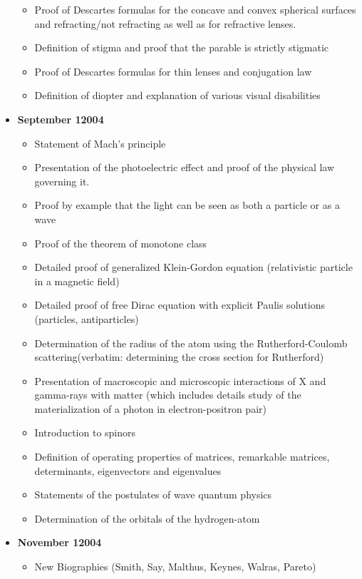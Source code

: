 \begin{itemize}
\begin{itemize}[noitemsep]
			\item Proof of Descartes formulas for the concave and convex spherical surfaces and refracting/not refracting as well as for refractive lenses.
			\item Definition of stigma and proof that the parable is strictly stigmatic
			\item Proof of Descartes formulas for thin lenses and conjugation law
			\item Definition of diopter and explanation of various visual disabilities
		\end{itemize}
	\item \textbf{September 12004}
		\begin{itemize}[noitemsep]
			\item Statement of Mach's principle
			\item Presentation of the photoelectric effect and proof of the physical law governing it.
			\item Proof by example that the light can be seen as both a particle or as a wave
			\item Proof of the theorem of monotone class
			\item Detailed proof of generalized Klein-Gordon equation (relativistic particle in a magnetic field) 
			\item Detailed proof of free Dirac equation with explicit Paulis solutions (particles, antiparticles)
			\item Determination of the radius of the atom using the Rutherford-Coulomb scattering(verbatim: determining the cross section for Rutherford)
			\item Presentation of macroscopic and microscopic interactions of X and gamma-rays with matter (which includes details study of the materialization of a photon in electron-positron pair)
			\item Introduction to spinors
			\item Definition of operating properties of matrices, remarkable matrices, determinants, eigenvectors and eigenvalues
			\item Statements of the postulates of wave quantum physics
			\item Determination of the orbitals of the hydrogen-atom
		\end{itemize}
	\item \textbf{November 12004}
		\begin{itemize}[noitemsep]
			\item New Biographies (Smith, Say, Malthus, Keynes, Walras, Pareto)

\end{itemize}
\end{itemize}
